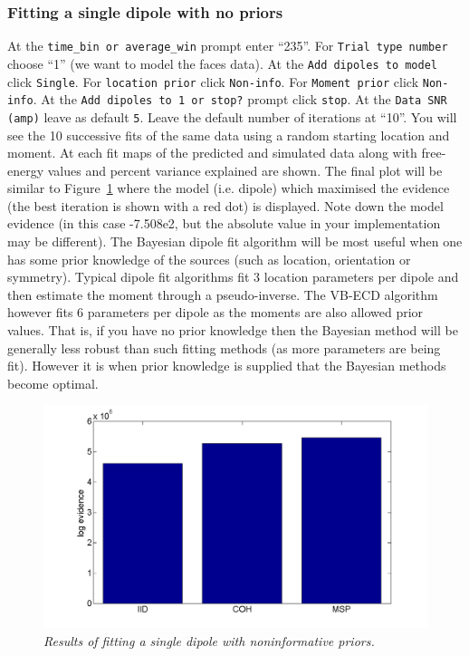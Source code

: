 \subsubsection{Fitting a single dipole with no priors}
At the \texttt{time\_bin or average\_win} prompt enter ``235''. For \texttt{Trial type number} choose ``1'' (we want to model the faces data). At the \texttt{Add dipoles to model} click \texttt{Single}. For \texttt{location prior} click \texttt{Non-info}. For \texttt{Moment prior} click \texttt{Non-info}. At the \texttt{Add dipoles to 1 or stop?} prompt click \texttt{stop}. At the \texttt{Data SNR (amp)} leave as default \texttt{5}. Leave the default number of iterations at ``10''.
You will see the 10 successive fits of the same data using a random starting location and moment. At each fit maps of the predicted and simulated data along with free-energy values and percent variance explained are shown. The final plot will be similar to Figure~\ref{meg_sloc:fig:9} where the model (i.e. dipole) which maximised the evidence (the best iteration is shown with a red dot) is displayed. Note down the model evidence (in this case -7.508e2, but the absolute value in your implementation may be different). The Bayesian dipole fit algorithm will be most useful when one has some prior knowledge of the sources (such as location, orientation or symmetry). Typical dipole fit algorithms fit 3 location parameters per dipole and then estimate the moment through a pseudo-inverse. The VB-ECD algorithm however fits 6 parameters per dipole as the moments are also allowed prior values. That is, if you have no prior knowledge then the Bayesian method will be generally less robust than such fitting methods (as more parameters are being fit). However it is when prior knowledge is supplied that the Bayesian methods become optimal.

\begin{figure}
\begin{center}
\includegraphics[width=140mm]{meg_sloc/slide9}
\caption{\em Results of fitting a single dipole with noninformative priors.\label{meg_sloc:fig:9}}
\end{center}
\end{figure}


